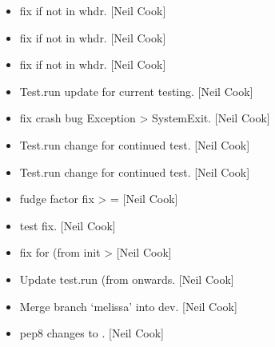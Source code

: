 \documentclass[a4paper,10pt,english]{report}
\begin{document}
\label{\detokenize{misc/changelog:id252}}\begin{itemize}
\item {} 
 \sphinxhyphen{} fix if  not in whdr. {[}Neil Cook{]}

\item {} 
 \sphinxhyphen{} fix if  not in whdr. {[}Neil Cook{]}

\item {} 
 \sphinxhyphen{} fix if  not in whdr. {[}Neil Cook{]}

\item {} 
Test.run \sphinxhyphen{} update for current testing. {[}Neil Cook{]}

\item {} 
 \sphinxhyphen{} fix crash bug Exception \textendash{}\textgreater{} SystemExit.
{[}Neil Cook{]}

\item {} 
Test.run \sphinxhyphen{} change for continued test. {[}Neil Cook{]}

\item {} 
Test.run \sphinxhyphen{} change for continued test. {[}Neil Cook{]}

\item {} 
 \sphinxhyphen{} fudge factor fix \textendash{}\textgreater{}  =
 {[}Neil Cook{]}

\item {} 
 \sphinxhyphen{} test fix. {[}Neil Cook{]}

\item {} 
 \sphinxhyphen{} fix for  (from init \textendash{}\textgreater{} 
{[}Neil Cook{]}

\item {} 
Update test.run \sphinxhyphen{}  (from  onwards. {[}Neil Cook{]}

\item {} 
Merge branch ‘melissa’ into dev. {[}Neil Cook{]}

\item {} 
 \sphinxhyphen{} pep8 changes to . {[}Neil Cook{]}


\end{itemize}
\end{document}
